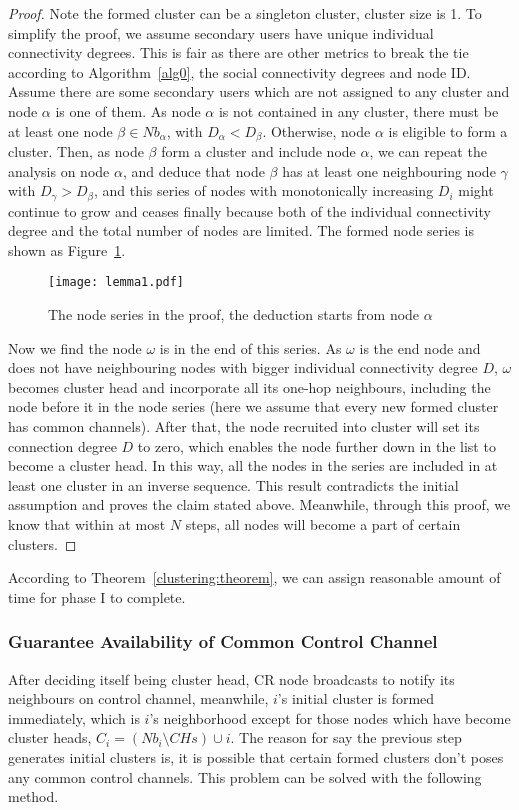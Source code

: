 \begin{proof}
Note the formed cluster can be a singleton cluster, \ie cluster size is 1.
To simplify the proof, we assume secondary users have unique individual connectivity degrees.
This is fair as there are other metrics to break the tie according to Algorithm~\ref{alg0}, \ie the social connectivity degrees and node ID.
Assume there are some secondary users which are not assigned to any cluster and node $\alpha$ is one of them.
As node $\alpha$ is not contained in any cluster, there must be at least one node $\beta\in Nb_\alpha$, with $D_{\alpha} < D_{\beta}$.
Otherwise, node $\alpha$ is eligible to form a cluster.
Then, as node $\beta$ form a cluster and include node $\alpha$, we can repeat the analysis on node $\alpha$, and deduce that node $\beta$ has at least one neighbouring node $\gamma$ with $D_{\gamma}>D_{\beta}$, and this series of nodes with monotonically increasing $D_i$ might continue to grow and ceases finally because both of the individual connectivity degree 
and the total number of nodes are limited.
The formed node series is shown as Figure~\ref{lemma1}.

\begin{figure}[ht!]
  \centering
\texttt{[image: lemma1.pdf]}
	\caption{The node series in the proof, the deduction starts from node $\alpha$}
	\label{lemma1}
\end{figure}


Now we find the node $\omega$ is in the end of this series.
As $\omega$ is the end node and does not have neighbouring nodes with bigger individual connectivity degree $D$, $\omega$ becomes cluster head and incorporate all its one-hop neighbours, including the node before it in the node series (here we assume that every new formed cluster has common channels).
After that, the node recruited into cluster will set its connection degree $D$ to zero, which enables the node further down in the list to become a cluster head.
In this way, all the nodes in the series are included in at least one cluster in an inverse sequence.
This result contradicts the initial assumption and proves the claim stated above.
Meanwhile, through this proof, we know that within at most $N$ steps, all nodes will become a part of certain clusters.
\end{proof}
According to Theorem~\ref{clustering:theorem}, we can assign reasonable amount of time for phase I to complete.



\subsubsection{Guarantee Availability of Common Control Channel}
After deciding itself being cluster head, CR node broadcasts to notify its neighbours on control channel, meanwhile, $i$'s initial cluster is formed immediately, which is $i$'s neighborhood except for those nodes which have become cluster heads, \ie $C_i=(Nb_i\setminus CHs)\cup i$.
The reason for say the previous step generates initial clusters is, it is possible that certain formed clusters don't poses any common control channels.
This problem can be solved with the following method. 

